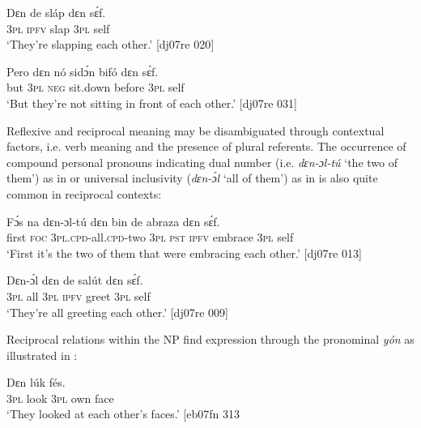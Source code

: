 \ea%
    \label{ex:key:1232}
    \gll Dɛn  de  sláp  dɛn  sɛ́f.\\
\textsc{3pl}  \textsc{ipfv}  slap  \textsc{3pl}  self\\

\glt ‘They’re slapping each other.’ [dj07re 020]
\z


\ea%
    \label{ex:key:1233}
    \gll Pero    dɛn  nó  sidɔ́n  bifó    dɛn  sɛ́f.\\
but    \textsc{3pl}  \textsc{neg}  sit.down  before  \textsc{3pl}  self\\

\glt ‘But they’re not sitting in front of each other.’ [dj07re 031]
\z

Reflexive and reciprocal meaning may be disambiguated through contextual factors, i.e. verb meaning and the presence of plural referents. The occurrence of compound personal pronouns \index{}indicating dual number (i.e. \textit{dɛn-ɔl-tú} ‘the two of them’) as in  or universal inclusivity (\textit{dɛn-ɔ́l} ‘all of them’) as in  is also quite common in reciprocal contexts: 


\ea%
    \label{ex:key:1234}
    \gll Fɔ́s  na  dɛn-ɔl-tú      dɛn  bin  de  abraza  dɛn  sɛ́f.\\
first  \textsc{foc}  \textsc{3pl.cpd}{}-all.\textsc{cpd}{}-two  \textsc{3pl}  \textsc{pst}  \textsc{ipfv}  embrace  \textsc{3pl}  self\\

\glt ‘First it’s the two of them that were embracing each other.’ [dj07re 013]
\z


\ea%
    \label{ex:key:1235}
    \gll Dɛn-ɔ́l  dɛn  de  salút  dɛn  sɛ́f.\\
{\textsc{3pl}  all}  \textsc{3pl}  \textsc{ipfv}  greet  \textsc{3pl}  self\\

\glt ‘They’re all greeting each other.’ [dj07re 009]
\z

Reciprocal relations within the \textsc{NP} find expression through the pronominal \textit{yón} as illustrated in :


\ea%
    \label{ex:key:1236}
    \gll Dɛn  lúk           fés.\\
\textsc{3pl} look \textsc{3pl}  own    face\\

\glt ‘They looked at each other’s faces.’ [eb07fn 313\textstylePichiexamplenumberZchnZchn{]}
\z

